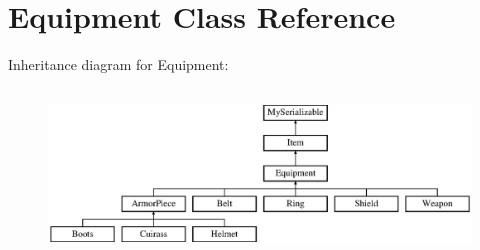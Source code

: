 \hypertarget{class_equipment}{}\section{Equipment Class Reference}
\label{class_equipment}
Inheritance diagram for Equipment\+:\begin{figure}[H]
\begin{center}
\leavevmode
\includegraphics[height=4.487180cm]{class_equipment}
\end{center}
\end{figure}
